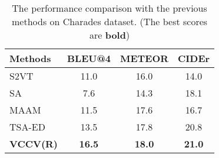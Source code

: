 \documentclass[a4paper,conference]{IEEEtran}
\begin{document}
\begin{table}[!h]
    \normalsize
	\renewcommand\arraystretch{1.05}
	\centering
	\caption{The performance comparison with the previous methods on Charades dataset. (The best scores are \textbf{bold})}

	\begin{tabular}{l|c|c|c}
		\hline
		{Methods}  
	    &BLEU@4 &METEOR &CIDEr  \\ \hline
        S2VT~\cite{Venugopalan_2015_ICCV} &11.0 &16.0 &14.0 \\
        SA~\cite{yao2015describing}  &7.6 &14.3 &18.1  \\
		MAAM~\cite{Fakoor2016Memory} &11.5 &17.6 &16.7 \\
		TSA-ED~\cite{wu2018interpretable}  &13.5 &17.8 &20.8  \\
		\hline
		{\textbf{VCCV(R)}} &\textbf{16.5} &\textbf{18.0} &\textbf{21.0}\\ 
		\hline
	\end{tabular}%

	\label{tab:charades}%
\end{table}
\end{document}
